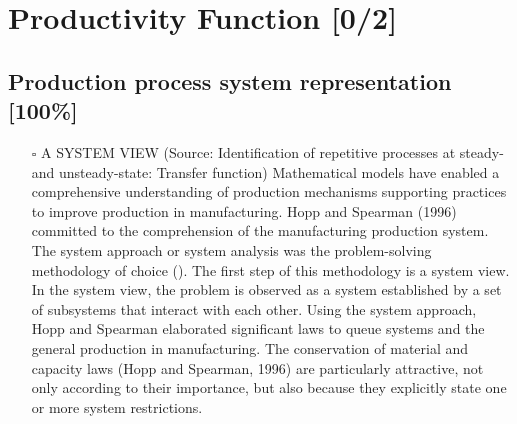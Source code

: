\documentclass{article}
\begin{document}
\section{Productivity Function [0/2]}
\label{sec:orgfb46c5b}
\subsection{Production process system representation [100\%]}
\label{sec:org151af63}

\begin{itemize}
\item[{$\square$}] A SYSTEM VIEW (Source: Identification of repetitive processes at steady- and unsteady-state: Transfer function)
Mathematical models have enabled a comprehensive understanding of production mechanisms supporting practices to improve production in manufacturing.
Hopp and Spearman (1996) committed to the comprehension of the manufacturing production system.
The system approach or system analysis was the problem-solving methodology of choice (\citep{Hopp2001}).
The first step of this methodology is a system view.
In the system view, the problem is observed as a system established by a set of subsystems that interact with each other.
Using the system approach, Hopp and Spearman elaborated significant laws to queue systems and the general production in manufacturing.
The conservation of material and capacity laws (Hopp and Spearman, 1996) are particularly attractive, not only according to their importance, but also because they explicitly state one or more system restrictions.


\end{itemize}
\end{document}
